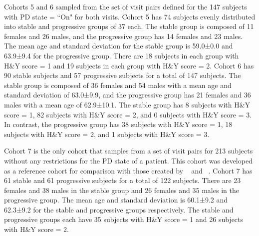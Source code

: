 \documentclass[10pt,letterpaper]{article}
\begin{document}
Cohorts 5 and 6 sampled from the set of visit pairs defined for the 147 subjects with PD state = ``On" for both visits. Cohort 5 has 74 subjects evenly distributed into stable 
and progressive groups of 37 each. The stable group is composed of 11 females and 26 males, and the progressive group has 14 females and 23 males. The mean age and standard 
deviation for the stable group is 59.0±0.0 and 63.9±9.4 for the progressive group. There are 18 subjects in each group with H\&Y score = 1 and 19 subjects in each group 
with H\&Y score = 2. Cohort 6 has 90 stable subjects and 57 progressive subjects for a total of 147 subjects. The stable group is composed of 36 females and 54 males with a mean 
age and standard deviation of 63.0±9.9, and the progressive group has 21 females and 36 males with a mean age of 62.9±10.1. The stable group has 8 subjects with H\&Y score = 1, 82 subjects 
with H\&Y score = 2, and 0 subjects with H\&Y score = 3. In contrast, the progressive group has 38 subjects with H\&Y score = 1, 18 subjects with H\&Y score = 2, and 1 subjects with 
H\&Y score = 3. 

Cohort 7 is the only cohort that samples from a set of visit pairs for 213 subjects without any restrictions for the PD state of a patient. This cohort was developed as a 
reference cohort for comparison with those created by ~\cite{shu2021predicting} and ~\cite{Arafe2023.05.05.539590}. Cohort 7 has 61 stable and 61 progressive subjects for a total 
of 122 subjects. There are 23 females and 38 males in the stable group and 26 females and 35 males in the progressive group. The mean age and standard deviation is 60.1±9.2 and 
62.3±9.2 for the stable and progressive groups respectively. The stable and progressive groups each have 35 subjects with H\&Y score = 1 and 26 subjects with H\&Y score = 2. 
\end{document}
